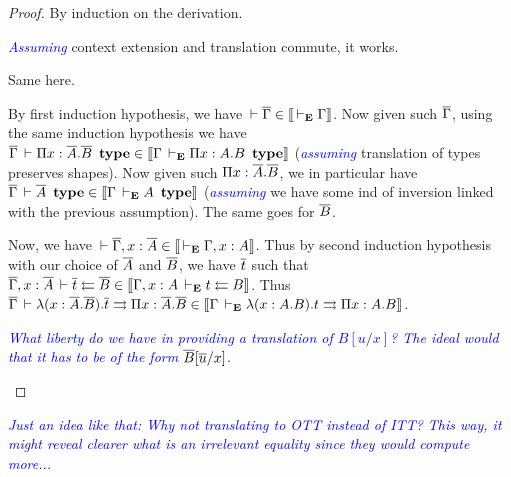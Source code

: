 \documentclass{amsart}
\newcommand\meta[1]{\noindent\textcolor{blue}{\emph{#1}}}
\begin{document}
\begin{proof}
  By induction on the derivation.
  \begin{caselist}
    \nextcase
    \begin{mathc}
    \end{mathc}
    \meta{Assuming} context extension and translation commute, it works.

    \nextcase
    \begin{mathc}
    \end{mathc}
    Same here.

    \nextcase
    \begin{mathc}
    \end{mathc}
    By first induction hypothesis, we have $\,\vdash \overline{\Gamma} \in \mathopen{{[\kern-0.14em[}} \,\vdash_\mathbf{E} \Gamma \mathclose{{]\kern-0.14em]}}$.
    Now given such $\overline{\Gamma}$, using the same induction hypothesis we have
    $\overline{\Gamma} \,\vdash \Pi x:\overline{A}.\overline{B}\ \operatorname{\mathbf{type}}
    \in \mathopen{{[\kern-0.14em[}} \Gamma \,\vdash_\mathbf{E} \Pi x:A.B\ \operatorname{\mathbf{type}} \mathclose{{]\kern-0.14em]}}$
    (\meta{assuming} translation of types preserves shapes).
    Now given such $\Pi x:\overline{A}.\overline{B}$, we in particular have
    $\barG \der \barA\ \type \in \den{\Gamma \dere A\ \type}$
    (\meta{assuming} we have some ind of inversion linked with the previous
    assumption). The same goes for $\overline{B}$.

    Now, we have $\,\vdash \overline{\Gamma}, x:\overline{A} \in \mathopen{{[\kern-0.14em[}} \,\vdash_\mathbf{E} \Gamma, x:A \mathclose{{]\kern-0.14em]}}$.
    Thus by second induction hypothesis with our choice of $\overline{A}$ and
    $\overline{B}$, we have $\overline{t}$ such that
    $\overline{\Gamma}, x:\overline{A} \,\vdash \overline{t} \leftleftarrows \overline{B} \in
    \mathopen{{[\kern-0.14em[}} \Gamma, x:A \,\vdash_\mathbf{E} t \leftleftarrows B \mathclose{{]\kern-0.14em]}}$.
    Thus $\overline{\Gamma} \,\vdash \lambda (x:\overline{A}.\overline{B}).\overline{t} \rightrightarrows \Pi x:\overline{A}.\overline{B}
    \in \mathopen{{[\kern-0.14em[}} \Gamma \,\vdash_\mathbf{E} \lambda (x:A.B).t \rightrightarrows \Pi x:A.B \mathclose{{]\kern-0.14em]}}$.

    \nextcase
    \begin{mathc}
    \end{mathc}
    \meta{What liberty do we have in providing a translation of $B[u/x]$? The
    ideal would that it has to be of the form $\overline{B}[\overline{u}/x]$.}
  \end{caselist}
\end{proof}

\meta{Just an idea like that: Why not translating to OTT instead of ITT? This
way, it might reveal clearer what is an irrelevant equality since they would
compute more...}
\end{document}
